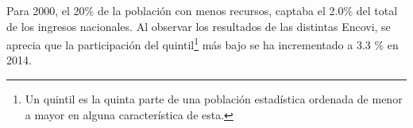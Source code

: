  Para 2000, el 20\% de la población con menos recursos, captaba el 2.0\% del total de los ingresos nacionales. Al observar los resultados de las distintas Encovi, se aprecia que la participación del quintil\footnote{Un quintil es la quinta parte de una población estadística ordenada de menor a mayor en alguna característica de esta.} más bajo se ha incrementado a 3.3 \% en 2014.